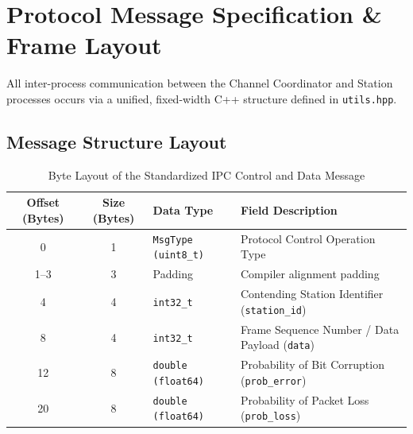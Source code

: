 \documentclass[12pt, a4paper]{article}
\begin{document}
\section{Protocol Message Specification \& Frame Layout}

All inter-process communication between the Channel Coordinator and Station processes occurs via a unified, fixed-width C++ structure defined in \texttt{utils.hpp}.

\subsection{Message Structure Layout}
\begin{table}[H]
\centering
\begin{tabularx}{\textwidth}{|c|c|l|X|}
\hline
\textbf{Offset (Bytes)} & \textbf{Size (Bytes)} & \textbf{Data Type} & \textbf{Field Description} \\ \hline
0 & 1 & \texttt{MsgType (uint8\_t)} & Protocol Control Operation Type \\ \hline
1--3 & 3 & Padding & Compiler alignment padding \\ \hline
4 & 4 & \texttt{int32\_t} & Contending Station Identifier (\texttt{station\_id}) \\ \hline
8 & 4 & \texttt{int32\_t} & Frame Sequence Number / Data Payload (\texttt{data}) \\ \hline
12 & 8 & \texttt{double (float64)} & Probability of Bit Corruption (\texttt{prob\_error}) \\ \hline
20 & 8 & \texttt{double (float64)} & Probability of Packet Loss (\texttt{prob\_loss}) \\ \hline
\end{tabularx}
\caption{Byte Layout of the Standardized IPC Control and Data Message}
\label{tab:message_layout}
\end{table}
\end{document}

